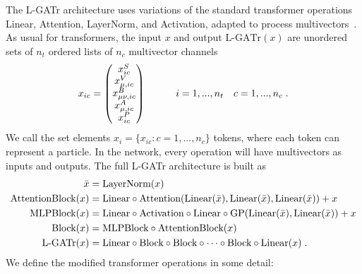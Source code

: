 \documentclass[submission, Phys]{SciPost}
\begin{document}
The L-GATr architecture uses variations of the standard transformer operations Linear, Attention, LayerNorm, and Activation, adapted to process multivectors~\cite{vaswani2017attention, xiong2020layer}. 
As usual for transformers, the input $x$ and output $\text{L-GATr}(x)$ are unordered sets of $n_t$ ordered lists of $n_c$ multivector channels
%
\begin{align}
 x_{ic}=\begin{pmatrix}x^S_{ic} \\ x^V_{\mu,ic} \\ x^B_{\mu\nu,ic} \\ x^A_{\mu,ic} \\ x^P_{ic}\end{pmatrix}
 \qquad\quad i =1,..., n_t \quad c =1,..., n_c \; .
\end{align}
%
We call the set elements $x_i=\{x_{ic}: c=1,...,n_c\}$ tokens, where each token can represent a particle. In the network, every operation will have multivectors as inputs and outputs. The full L-GATr architecture is built as
%
\begin{align}
    \bar x &= \text{LayerNorm}(x) \notag \\
    \text{AttentionBlock}(x) &= \text{Linear}\circ \text{Attention}(\text{Linear}(\bar x), \text{Linear}(\bar x), \text{Linear}(\bar x)) + x \notag \\
    \text{MLPBlock}(x) &= \text{Linear}\circ \text{Activation}\circ \text{Linear}\circ \text{GP}(\text{Linear}(\bar x), \text{Linear}(\bar x))+x \notag \\
    \text{Block}(x) &= \text{MLPBlock}\circ \text{AttentionBlock}(x) \notag \\
    \text{L-GATr}(x) &= \text{Linear}\circ \text{Block}\circ \text{Block}\circ\cdots \circ \text{Block}\circ\text{Linear}(x) \; .
\end{align}
%
We define the modified transformer operations in some detail:
%
\end{document}
